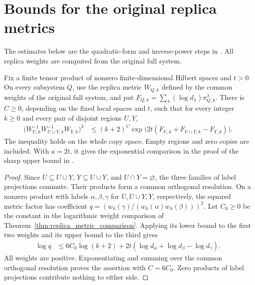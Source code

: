 \section{Bounds for the original replica metrics}
\label{sec:replica_pinned_upper_estimates}

The estimates below are the quadratic-form and inverse-power steps in
\cite[Section~8, lines~367--418]{OpenAI2026AreaLaw}. All replica weights
are computed from the original full system.

\begin{theorem}
    \label{thm:replica_pinned_factor_exp_upper}
    \leanok
    Fix a finite tensor product of nonzero finite-dimensional Hilbert
    spaces and $t>0$. On every subsystem $Q$, use the replica metric
    $W_{Q,k}$ defined by the common weights of the original full system,
    and put $F_{Q,k}=\sum_\lambda(\log d_\lambda)\pi_{Q,k}^\lambda$.
    There is $C\ge0$, depending on the fixed local spaces and $t$, such
    that for every integer $k\ge0$ and every pair of disjoint regions
    $U,Y$,
    \begin{align*}
        \bigl(W_{U,k}^{-1}W_{U\cup Y,k}^{-1}W_{Y,k}\bigr)^2
         & \le (k+2)^C
        \exp\bigl(2t(F_{U,k}+F_{U\cup Y,k}-F_{Y,k})\bigr).
    \end{align*}
    The inequality holds on the whole copy space. Empty regions and
    zero copies are included. With $a=2t$, it gives the exponential
    comparison in the proof of the sharp upper bound
    in \cite[Section~8]{OpenAI2026AreaLaw}.
\end{theorem}
\begin{proof}
    \leanok
    Since $U\subseteq U\cup Y$, $Y\subseteq U\cup Y$, and
    $U\cap Y=\varnothing$, the three families of label projections
    commute. Their products form a common orthogonal resolution.
    On a nonzero product with labels $\alpha,\beta,\gamma$ for
    $U,U\cup Y,Y$, respectively, the squared metric factor has coefficient
    $q=(w_k(\gamma)/(w_k(\alpha)w_k(\beta)))^2$.
    Let $C_0\ge0$ be the constant in the logarithmic weight comparison
    of Theorem~\ref{thm:replica_metric_comparison}. Applying its lower
    bound to the first two weights and its upper bound to the third gives
    \begin{align*}
        \log q
         & \le 6C_0\log(k+2)
        +2t(\log d_\alpha+\log d_\beta-\log d_\gamma).
    \end{align*}
    All weights are positive. Exponentiating and summing over the common
    orthogonal resolution proves the assertion with $C=6C_0$.
    Zero products of label projections contribute nothing to either side.
\end{proof}

